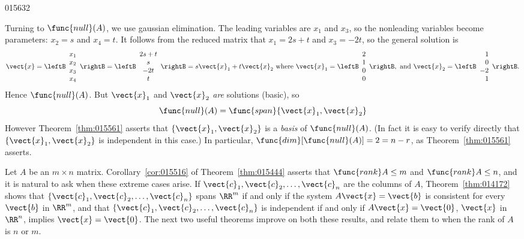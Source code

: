 \begin{example}{}{015632}
\begin{solution}
Turning to $\func{null}(A)$, we use gaussian elimination. The leading variables are $x_{1}$ and $x_{3}$, so the nonleading variables become parameters: $x_{2} = s$ and $x_{4} = t$. It follows from the reduced matrix that $x_{1} = 2s + t$ and $x_{3} = -2t$, so the general solution is
\begin{equation*}
\vect{x} = 
\leftB \begin{array}{r}
x_1\\
x_2\\
x_3\\
x_4
\end{array} \rightB = \leftB \begin{array}{c}
2s + t\\
s\\
-2t\\
t
\end{array} \rightB = s\vect{x}_1 + t\vect{x}_2 \mbox{ where } \vect{x}_1 = 
\leftB \begin{array}{r}
2\\
1\\
0\\
0
\end{array} \rightB, \mbox{ and } \vect{x}_2 =
\leftB \begin{array}{r}
1\\
0\\
-2\\
1
\end{array} \rightB.
\end{equation*}
Hence $\func{null}(A)$. But $\vect{x}_{1}$ and $\vect{x}_{2}$ \textit{are} solutions (basic), so
\begin{equation*}
\func{null}(A) = \func{span}\{\vect{x}_1, \vect{x}_2 \}
\end{equation*}
However Theorem~\ref{thm:015561} asserts that $\{\vect{x}_{1}, \vect{x}_{2}\}$ is a \textit{basis} of $\func{null}(A)$. (In fact it is easy to verify directly that $\{\vect{x}_{1}, \vect{x}_{2}\}$ is independent in this case.) In particular, $\func{dim}[\func{null}(A)] = 2 = n - r$, as Theorem~\ref{thm:015561} asserts.
\end{solution}
\end{example}

Let $A$ be an $m \times n$ matrix. Corollary~\ref{cor:015516} of Theorem~\ref{thm:015444} asserts that $\func{rank} A \leq m$ and $\func{rank} A \leq n$, and it is natural to ask when these extreme cases arise. If $\vect{c}_{1}, \vect{c}_{2}, \dots, \vect{c}_{n}$ are the columns of $A$, Theorem~\ref{thm:014172} shows that $\{\vect{c}_{1}, \vect{c}_{2}, \dots, \vect{c}_{n}\}$ spans $\RR^m$ if and only if the system $A\vect{x} = \vect{b}$ is consistent for every $\vect{b}$ in $\RR^m$, and that $\{\vect{c}_{1}, \vect{c}_{2}, \dots, \vect{c}_{n}\}$ is independent if and only if $A\vect{x} = \vect{0}$, $\vect{x}$ in $\RR^n$, implies $\vect{x} = \vect{0}$. The next two useful theorems improve on both these results, and relate them to when the rank of $A$ is $n$ or $m$.

